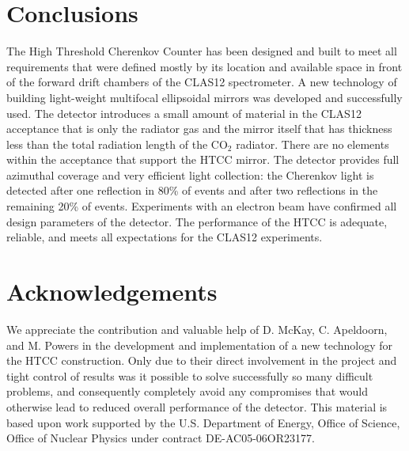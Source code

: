 \section{Conclusions}

The High Threshold Cherenkov Counter has been designed and built to meet all requirements that were defined
mostly by its location and available space in front of the forward drift chambers of the CLAS12 spectrometer. A
new technology of building light-weight multifocal ellipsoidal mirrors was developed and successfully used. The
detector introduces a small amount of material in the CLAS12 acceptance that is only the radiator gas and the
mirror itself that has thickness less than the total radiation length of the CO$_2$ radiator. There are no
elements within the acceptance that support the HTCC mirror. The detector provides full azimuthal coverage and
very efficient light collection: the Cherenkov light is detected after one reflection in 80\% of events and after two
reflections in the remaining 20\% of events. Experiments with an electron beam have confirmed all design
parameters of the detector. The performance of the HTCC is adequate, reliable, and meets all expectations for
the CLAS12 experiments.

\section{Acknowledgements}

We appreciate the contribution and valuable help of D. McKay, C. Apeldoorn, and M. Powers in the development and
implementation of a new technology for the HTCC construction. Only due to their direct involvement in the project
and tight control of results was it possible to solve successfully so many difficult problems, and consequently
completely avoid any compromises that would otherwise lead to reduced overall performance of the detector.
This material is based upon work supported by the U.S. Department of Energy, Office of Science, Office of Nuclear
Physics under contract DE-AC05-06OR23177.



